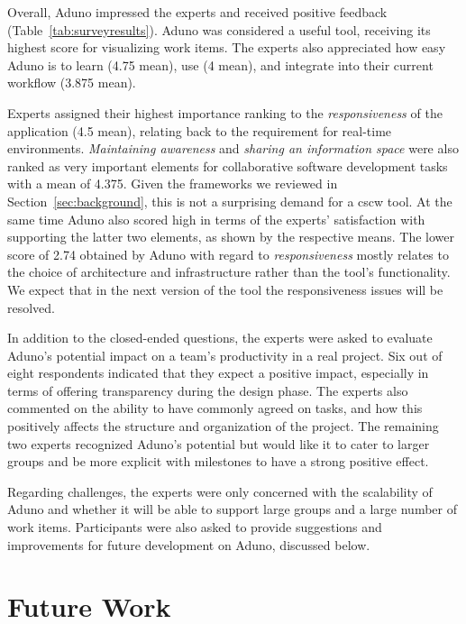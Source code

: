 \documentclass[conference]{IEEEtran}
\begin{document}
Overall, Aduno impressed the experts and received positive feedback (Table~\ref{tab:surveyresults}). Aduno was considered a useful tool, receiving its highest score for visualizing work items. The experts also appreciated how easy Aduno is to learn (4.75 mean), use (4 mean), and integrate into their current workflow (3.875 mean).

Experts assigned their highest importance ranking to the \textit{responsiveness} of the application (4.5 mean), relating back to the requirement for real-time environments. \textit{Maintaining awareness} and \textit{sharing an information space} were also ranked as very important elements for collaborative software development tasks with a mean of 4.375. Given the frameworks we reviewed in Section~\ref{sec:background}, this is not a surprising demand for a {\sc cscw} tool. At the same time Aduno also scored high in terms of the experts' satisfaction with supporting the latter two elements, as shown by the respective means. The lower score of 2.74 obtained by Aduno with regard to \textit{responsiveness} mostly relates to the choice of architecture and infrastructure rather than the tool's functionality. We expect that in the next version of the tool the responsiveness issues will be resolved. 


In addition to the closed-ended questions, the experts were asked to evaluate Aduno's potential impact on a team's productivity in a real project. Six out of eight respondents indicated that they expect a positive impact, especially in terms of offering transparency during the design phase. The experts also commented on the ability to have commonly agreed on tasks, and how this positively affects the structure and organization of the project. The remaining two experts recognized Aduno's potential but would like it to cater to larger groups and be more explicit with milestones to have a strong positive effect.

Regarding challenges, the experts were only concerned with the scalability of Aduno and whether it will be able to support large groups and a large number of work items. Participants were also asked to provide suggestions and improvements for future development on Aduno, discussed below.

\section{Future Work}
\label{sec:future}
\end{document}
